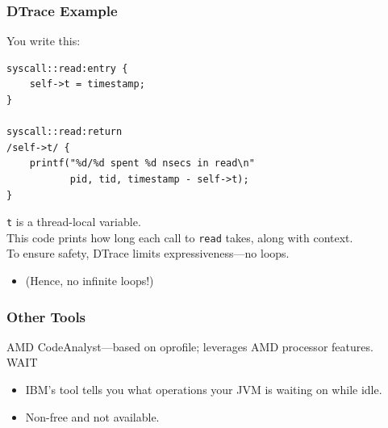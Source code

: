 \begin{frame}[fragile]
  \frametitle{DTrace Example}

\large
\begin{changemargin}{1cm}

  You write this:

  \begin{lstlisting}
syscall::read:entry {
    self->t = timestamp;
}

syscall::read:return
/self->t/ {
    printf("%d/%d spent %d nsecs in read\n"
           pid, tid, timestamp - self->t);
}
  \end{lstlisting}

    {\tt t} is a thread-local variable.\\
    This code prints how long each call to {\tt read} takes, along with
      context.\\[1em]
    To ensure safety, DTrace limits expressiveness---no loops.
      \begin{itemize}
        \item (Hence, no infinite loops!)
      \end{itemize}
      \end{changemargin}

\end{frame}

\begin{frame}[fragile]
  \frametitle{Other Tools}

\large
\begin{changemargin}{1.5cm}

    AMD CodeAnalyst---based on oprofile; leverages AMD processor features.\\[1em]

    WAIT\\[0em]
      \begin{itemize}
        \item IBM's tool tells you what operations your JVM is waiting on while
          idle.
        \item Non-free and not available.
      \end{itemize}
      \end{changemargin}
\end{frame}

